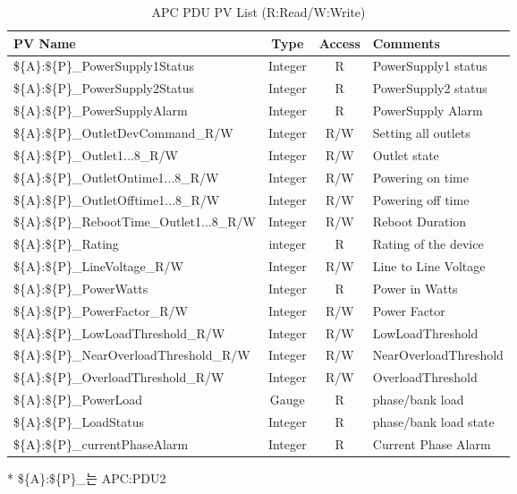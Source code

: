 \documentclass[11pt
  , a4paper
  , article
  , oneside
]{memoir}
\begin{document}
\begin{table}[h!]
\begin{center}
\small 
\begin{tabulary}{\textwidth}{L|C|C|L}
PV Name& Type & Access & Comments\\ \hline
\$\{A\}:\$\{P\}\_PowerSupply1Status & Integer & R & PowerSupply1 status\\ \hline
\$\{A\}:\$\{P\}\_PowerSupply2Status & Integer & R & PowerSupply2 status\\ \hline
\$\{A\}:\$\{P\}\_PowerSupplyAlarm & Integer & R & PowerSupply Alarm\\ \hline
\$\{A\}:\$\{P\}\_OutletDevCommand\_R/W & Integer & R/W & Setting all outlets\\ \hline
\$\{A\}:\$\{P\}\_Outlet1...8\_R/W & Integer & R/W & Outlet state\\ \hline
\$\{A\}:\$\{P\}\_OutletOntime1...8\_R/W & Integer & R/W & Powering on time \\ \hline
\$\{A\}:\$\{P\}\_OutletOfftime1...8\_R/W & Integer & R/W & Powering off time \\ \hline
\$\{A\}:\$\{P\}\_RebootTime\_Outlet1...8\_R/W & Integer & R/W & Reboot Duration\\ \hline
\$\{A\}:\$\{P\}\_Rating & integer & R & Rating of the device \\ \hline
\$\{A\}:\$\{P\}\_LineVoltage\_R/W & Integer & R/W & Line to Line Voltage\\ \hline
\$\{A\}:\$\{P\}\_PowerWatts & Integer & R & Power in Watts \\ \hline
\$\{A\}:\$\{P\}\_PowerFactor\_R/W & Integer & R/W & Power Factor \\ \hline
\$\{A\}:\$\{P\}\_LowLoadThreshold\_R/W & Integer & R/W & LowLoadThreshold \\ \hline
\$\{A\}:\$\{P\}\_NearOverloadThreshold\_R/W & Integer & R/W & NearOverloadThreshold\\ \hline
\$\{A\}:\$\{P\}\_OverloadThreshold\_R/W & Integer & R/W & OverloadThreshold\\ \hline
\$\{A\}:\$\{P\}\_PowerLoad & Gauge & R & phase/bank load \\ \hline
\$\{A\}:\$\{P\}\_LoadStatus & Integer & R & phase/bank load state \\ \hline
\$\{A\}:\$\{P\}\_currentPhaseAlarm & Integer & R & Current Phase Alarm\\ \hline
\end{tabulary}
\caption{APC PDU PV List (R:Read/W:Write)  }{* \$\{A\}:\$\{P\}\_는 APC:PDU2}
  \label{table:apcpvlist} 
\end{center}
\end{table} 
\end{document}

